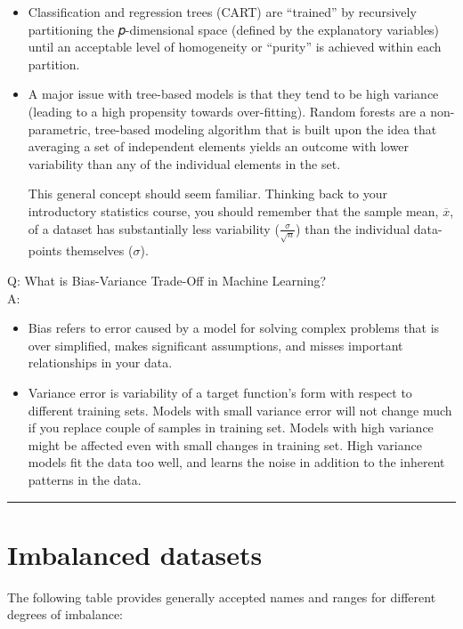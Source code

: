 \documentclass[
  a4paper,
  twoside,
  openright]{book}
\providecommand{\tightlist}{%
  \setlength{\itemsep}{0pt}\setlength{\parskip}{0pt}}
\theoremstyle{definition}
\theoremstyle{definition}
\theoremstyle{definition}
\theoremstyle{definition}
\theoremstyle{remark}
\begin{document}
\begin{itemize}
\item
  Classification and regression trees (CART) are ``trained'' by recursively partitioning the 𝑝-dimensional space (defined by the explanatory variables) until an acceptable level of homogeneity or ``purity'' is achieved within each partition.
\item
  A major issue with tree-based models is that they tend to be high variance (leading to a high propensity towards over-fitting). Random forests are a non-parametric, tree-based modeling algorithm that is built upon the idea that averaging a set of independent elements yields an outcome with lower variability than any of the individual elements in the set.

  This general concept should seem familiar. Thinking back to your introductory statistics course, you should remember that the sample mean, \(\overline{x}\), of a dataset has substantially less variability (\(\frac{\sigma}{\sqrt{n}}\)) than the individual data-points themselves (\(\sigma\)).
\end{itemize}

Q: What is Bias-Variance Trade-Off in Machine Learning?\\
A:

\begin{itemize}
\tightlist
\item
  Bias refers to error caused by a model for solving complex problems that is over simplified, makes significant assumptions, and misses important relationships in your data.
\item
  Variance error is variability of a target function's form with respect to different training sets. Models with small variance error will not change much if you replace couple of samples in training set. Models with high variance might be affected even with small changes in training set. High variance models fit the data too well, and learns the noise in addition to the inherent patterns in the data.
\end{itemize}

\begin{center}\rule{0.5\linewidth}{0.5pt}\end{center}

\section{Imbalanced datasets}\label{imbalanced-datasets}

The following table provides generally accepted names and ranges for different degrees of imbalance:
\end{document}
